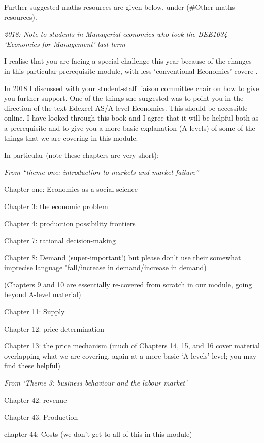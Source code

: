 \documentclass[]{article}
\begin{document}
Further suggested maths resources are given below, under
(\#Other-maths-resources).

\bigskip

\emph{2018: Note to students in Managerial economics who took the
BEE1034 `Economics for Management' last term}

I realise that you are facing a special challenge this year because of
the changes in this particular prerequisite module, with less
`conventional Economics' covere .

In 2018 I discussed with your student-staff liaison committee chair on
how to give you further support. One of the things she suggested was to
point you in the direction of the text Edexcel AS/A level Economics.
This should be accessible online. I have looked through this book and I
agree that it will be helpful both as a prerequisite and to give you a
more basic explanation (A-levels) of some of the things that we are
covering in this module.

In particular (note these chapters are very short):

\emph{From ``theme one: introduction to markets and market failure''}

Chapter one: Economics as a social science

Chapter 3: the economic problem

Chapter 4: production possibility frontiers

Chapter 7: rational decision-making

Chapter 8: Demand (super-important!) but please don't use their somewhat
imprecise language "fall/increase in demand/increase in demand)

(Chapters 9 and 10 are essentially re-covered from scratch in our
module, going beyond A-level material)

\bigskip

Chapter 11: Supply

Chapter 12: price determination

Chapter 13: the price mechanism (much of Chapters 14, 15, and 16 cover
material overlapping what we are covering, again at a more basic
`A-levels' level; you may find these helpful)

\emph{From `Theme 3: business behaviour and the labour market'}

Chapter 42: revenue

Chapter 43: Production

chapter 44: Costs (we don't get to all of this in this module)
\end{document}
